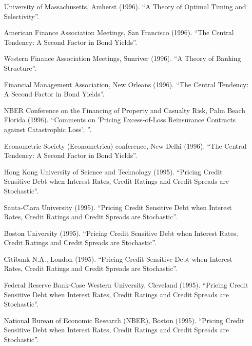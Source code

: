 \documentclass{article}
\begin{document}
\begin{etaremune}
{\item University of Massachusetts, Amherst (1996).
``A Theory of Optimal Timing and Selectivity''.  

\item American Finance Association Meetings, San Francisco (1996).
``The Central Tendency: A Second Factor in Bond Yields''.

\item Western Finance Association Meetings, Sunriver (1996). 
``A Theory of Banking Structure''. 

\item Financial Management Association, New Orleans (1996).
``The Central Tendency: A Second Factor in Bond Yields''.

\item NBER Conference on the Financing of Property and Casualty Risk,
Palm Beach Florida (1996). 
``Comments on 'Pricing Excess-of-Loss Reinsurance Contracts against
Catastrophic Loss', ''. 

\item Econometric Society (Econometrica) conference, New
Delhi (1996). 
``The Central Tendency: A Second Factor in Bond Yields''.

\item Hong Kong University of Science and Technology (1995).
``Pricing Credit Sensitive Debt when Interest Rates, Credit Ratings
and Credit Spreads are Stochastic''.  

\item Santa-Clara University (1995).
``Pricing Credit Sensitive Debt when Interest Rates, Credit Ratings
and Credit Spreads are Stochastic''.  

\item Boston University (1995).
``Pricing Credit Sensitive Debt when Interest Rates, Credit Ratings
and Credit Spreads are Stochastic''.  

\item Citibank N.A., London (1995).
``Pricing Credit Sensitive Debt when Interest Rates, Credit Ratings
and Credit Spreads are Stochastic''.  

\item Federal Reserve Bank-Case Western University, Cleveland (1995).
``Pricing Credit Sensitive Debt when Interest Rates, Credit Ratings
and Credit Spreads are Stochastic''.  

\item National Bureau of Economic Research (NBER), Boston (1995).
``Pricing Credit Sensitive Debt when Interest Rates, Credit Ratings
and Credit Spreads are Stochastic''.  

}
\end{etaremune}
\end{document}
